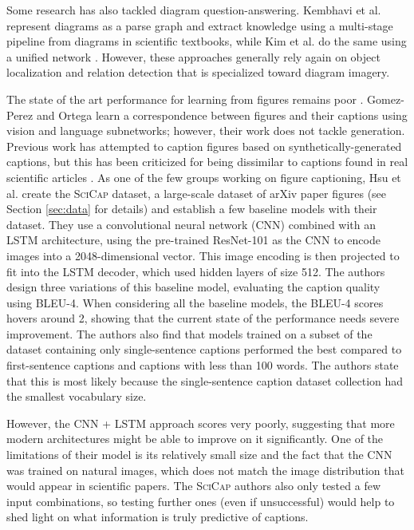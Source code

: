 \documentclass{article}
\newcommand{\scicap}{\textsc{SciCap}\xspace}
\begin{document}
Some research has also tackled diagram question-answering. Kembhavi et al. \citep{DBLP:conf/eccv/KembhaviSKSHF16} represent diagrams as a parse graph and extract knowledge using a multi-stage pipeline from diagrams in scientific textbooks, while Kim et al. do the same using a unified network \citep{Kim2018DynamicGG}. However, these approaches generally rely again on object localization and relation detection that is specialized toward diagram imagery.

The state of the art performance for learning from figures remains poor \citep{scicap}. Gomez-Perez and Ortega \citep{10.1145/3360901.3364420} learn a correspondence between figures and their captions using vision and language subnetworks; however, their work does not tackle generation. Previous work has attempted to caption figures based on synthetically-generated captions, but this has been criticized for being dissimilar to captions found in real scientific articles \citep{scicap}. As one of the few groups working on figure captioning, Hsu et al. \citep{scicap} create the \scicap dataset, a large-scale dataset of arXiv paper figures (see Section \ref{sec:data} for details) and establish a few baseline models with their dataset. They use a convolutional neural network (CNN) combined with an LSTM architecture, using the pre-trained ResNet-101 as the CNN to encode images into a 2048-dimensional vector. This image encoding is then projected to fit into the LSTM decoder, which used hidden layers of size 512. The authors design three variations of this baseline model, evaluating the caption quality using BLEU-4. When considering all the baseline models, the BLEU-4 scores hovers around 2, showing that the current state of the performance needs severe improvement. The authors also find that models trained on a subset of the dataset containing only single-sentence captions performed the best compared to first-sentence captions and captions with less than 100 words. The authors state that this is most likely because the single-sentence caption dataset collection had the smallest vocabulary size.

However, the CNN + LSTM approach scores very poorly, suggesting that more modern architectures might be able to improve on it significantly. One of the limitations of their model is its relatively small size and the fact that the CNN was trained on natural images, which does not match the image distribution that would appear in scientific papers. The \scicap authors also only tested a few input combinations, so testing further ones (even if unsuccessful) would help to shed light on what information is truly predictive of captions.
\end{document}
